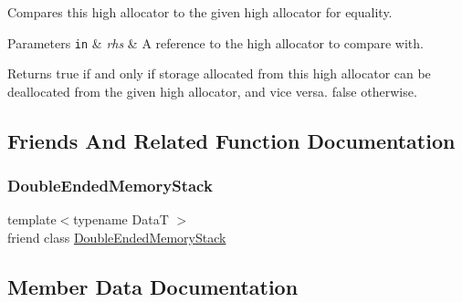 Compares this high allocator to the given high allocator for equality.


\begin{DoxyParams}[1]{Parameters}
\mbox{\tt in}  & {\em rhs} & A reference to the high allocator to compare with. \\
\hline
\end{DoxyParams}
\begin{DoxyReturn}{Returns}
{\ttfamily true} if and only if storage allocated from this high allocator can be deallocated from the given high allocator, and vice versa. {\ttfamily false} otherwise. 
\end{DoxyReturn}


\subsection{Friends And Related Function Documentation}
\hypertarget{structmage_1_1_double_ended_memory_stack_1_1_high_allocator_a10ae729d55b8c0017057250445835680}{}\label{structmage_1_1_double_ended_memory_stack_1_1_high_allocator_a10ae729d55b8c0017057250445835680} 
\subsubsection{\texorpdfstring{Double\+Ended\+Memory\+Stack}{DoubleEndedMemoryStack}}
{\footnotesize\ttfamily template$<$typename DataT $>$ \\
friend class \hyperlink{classmage_1_1_double_ended_memory_stack}{Double\+Ended\+Memory\+Stack}\hspace{0.3cm}{\ttfamily [friend]}}



\subsection{Member Data Documentation}
\hypertarget{structmage_1_1_double_ended_memory_stack_1_1_high_allocator_afb9b7e67c0af8061cda859426a1f929b}{}\label{structmage_1_1_double_ended_memory_stack_1_1_high_allocator_afb9b7e67c0af8061cda859426a1f929b} 
